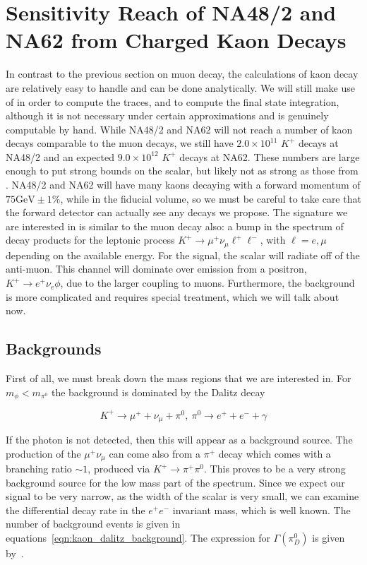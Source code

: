 \section{Sensitivity Reach of NA48/2 and NA62 from Charged Kaon Decays}
In contrast to the previous section on muon decay, the calculations of kaon decay are relatively easy to handle and can be done analytically.
We will still make use of \feyncalc in order to compute the traces, and \mathematica to compute the final state integration, although it is not necessary under certain approximations and is genuinely computable by hand.
While NA48/2 and NA62 will not reach a number of kaon decays comparable to the muon decays, we still have $2.0 \times 10^{11}$ $K^+$ decays at NA48/2 and an expected $9.0 \times 10^{12}$ $K^+$ decays at NA62.
These numbers are large enough to put strong bounds on the scalar, but likely not as strong as those from \mueee.
NA48/2 and NA62 will have many kaons decaying with a forward momentum of $75\textrm{GeV} \pm 1\%$, while in the fiducial volume, so we must be careful to take care that the forward detector can actually see any decays we propose.
The signature we are interested in is similar to the muon decay also: a bump in the spectrum of decay products for the leptonic process $K^+ \rightarrow \mu^+ \nu_\mu \ell^+ \ell^-$, with $\ell = e, \mu$ depending on the available energy.
For the signal, the scalar will radiate off of the anti-muon.
This channel will dominate over emission from a positron, $K^+ \rightarrow e^+ \nu_e \phi$, due to the larger coupling to muons.
Furthermore, the background is more complicated and requires special treatment, which we will talk about now.

\subsection{Backgrounds}
First of all, we must break down the mass regions that we are interested in.
For $m_\phi < m_{\pi^0}$ the background is dominated by the Dalitz decay

\begin{equation}
K^+ \rightarrow \mu^+ + \nu_\mu + \pi^0,~\pi^0 \rightarrow e^+ + e^- + \gamma
\end{equation}

\noindent If the photon is not detected, then this will appear as a background source.
The production of the $\mu^+ \nu_\mu$ can come also from a $\pi^+$ decay which comes with a branching ratio $\sim 1$, produced via $K^+ \rightarrow \pi^+ \pi^0$.
This proves to be a very strong background source for the low mass part of the spectrum.
Since we expect our signal to be very narrow, as the width of the scalar is very small, we can examine the differential decay rate in the $e^+ e^-$ invariant mass, which is well known.
The number of background events is given in equations~\ref{eqn:kaon_dalitz_background}.
The expression for $\Gamma(\pi^0_D)$ is given by~\cite{Mikaelian:1972yg}.

